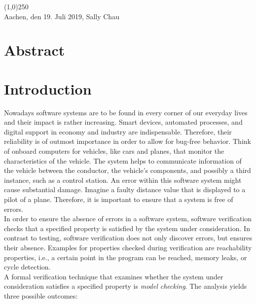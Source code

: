 \documentclass[a4paper, 12pt, twoside]{report}
\begin{document}
	\noindent\line(1,0){250}\\
	Aachen, den 19. Juli 2019, Sally Chau
	
	\clearpage\mbox{}\clearpage
	
	\chapter*{Abstract}
	
	\clearpage\mbox{}\clearpage
	
	\doublespacing
	\tableofcontents
	\singlespacing
	\clearpage\mbox{}\clearpage
	\thispagestyle{empty} 
	
	\pagestyle{fancy}
	\fancyhead[RE]{\nouppercase\leftmark}
	\fancyhead[LO]{\nouppercase\rightmark}
	\fancyhead[LE,RO]{\thepage}
	\cfoot{}
	
	
	\chapter{Introduction}
	
	Nowadays software systems are to be found in every corner of our everyday lives and their impact is rather increasing. Smart devices, automated processes, and digital support in economy and industry are indispensable. Therefore, their reliability is of outmost importance in order to allow for bug-free behavior. Think of onboard computers for vehicles, like cars and planes, that monitor the characteristics of the vehicle. The system helps to communicate information of the vehicle between the conductor, the vehicle's components, and possibly a third instance, such as a control station. An error within this software system might cause substantial damage. Imagine a faulty distance value that is displayed to a pilot of a plane. Therefore, it is important to ensure that a system is free of errors. \\
	
	In order to ensure the absence of errors in a software system, software verification checks that a specified property is satisfied by the system under consideration. In contrast to testing, software verification does not only discover errors, but ensures their absence. Examples for properties checked during verification are reachability properties, i.e., a certain point in the program can be reached, memory leaks, or cycle detection.\\
	
	A formal verification technique that examines whether the system under consideration satisfies a specified property is \textit{model checking}. The analysis yields three possible outcomes:
	
\end{document}
